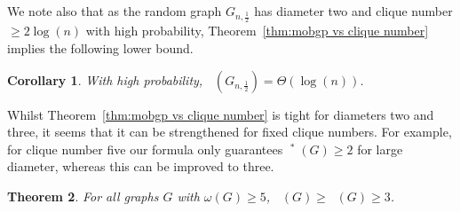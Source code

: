 \documentclass[a4paper,12pt]{article}
\DeclareMathOperator{\mob}{Mob_{gp}}
\DeclareMathOperator{\cmob}{Mob^*_{gp}}
\newtheorem{theorem}{Theorem}[section]
\newtheorem{corollary}[theorem]{Corollary}
\theoremstyle{definition}
\begin{document}
	We note also that as the random graph $G_{n,\frac{1}{2}}$ has diameter two and clique number $\geq 2\log (n)$ with high probability, Theorem~\ref{thm:mobgp vs clique number} implies the following lower bound.
	\begin{corollary}
		With high probability, $\mob (G_{n,\frac{1}{2}}) = \Theta (\log (n))$.
	\end{corollary}
	
	Whilst Theorem~\ref{thm:mobgp vs clique number} is tight for diameters two and three, it seems that it can be strengthened for fixed clique numbers. For example, for clique number five our formula only guarantees $\mob ^*(G) \geq 2$ for large diameter, whereas this can be improved to three.
	
	\begin{theorem}\label{the:clique num 5}
		For all graphs $G$ with $\omega(G) \geq 5$, $\mob(G) \geq \cmob(G) \geq 3$.
	\end{theorem}
\end{document}
